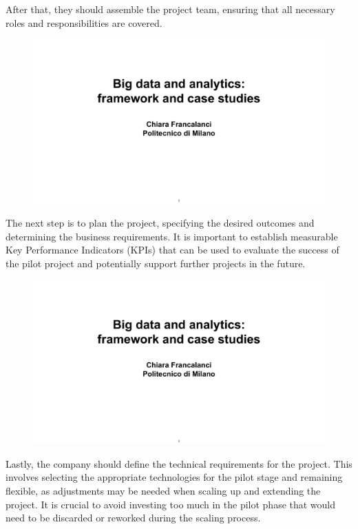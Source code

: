 After that, they should assemble the project team, ensuring that all
necessary roles and responsibilities are covered.

\begin{figure}[!h]
    \centering
    \includegraphics[page=87, trim = 1cm 1.5cm 1.5cm 3cm, clip, width=\textwidth]{images/06 - BIG_DATA.pdf}
\end{figure}

The next step is to plan the project, specifying the desired outcomes
and determining the business requirements. It is important to establish
measurable Key Performance Indicators (KPIs) that can be used to
evaluate the success of the pilot project and potentially support
further projects in the future.

\begin{figure}[!h]
    \centering
    \includegraphics[page=88, trim = 0cm 3cm 1.5cm 4.5cm, clip, width=\textwidth]{images/06 - BIG_DATA.pdf}
\end{figure}

Lastly, the company should define the technical requirements for the
project. This involves selecting the appropriate technologies for the
pilot stage and remaining flexible, as adjustments may be needed when
scaling up and extending the project. It is crucial to avoid investing
too much in the pilot phase that would need to be discarded or reworked
during the scaling process.

